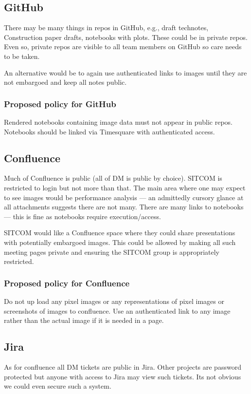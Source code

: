 \subsection{GitHub}
There may be many things in repos in GitHub, e.g., draft technotes, Construction paper drafts, notebooks with plots.
These could be in private repos.
Even so, private repos are visible to all team members on GitHub so care needs to be taken.

An alternative would be to again use authenticated links to images until they are not embargoed and keep all notes public.

\subsubsection{Proposed policy for GitHub}
Rendered notebooks containing image data must not appear in public repos.
Notebooks should be linked via Timesquare with authenticated access.

\subsection{Confluence}
Much of Confluence is public (all of DM is public by choice).
SITCOM is restricted to login but not more than that.
The main area where one may expect to see images would be performance analysis --- an admittedly cursory glance at all attachments suggests there are not many.
There are many links to notebooks --- this is fine as notebooks require execution/access.

SITCOM would like a Confluence space where they could share presentations with potentially embargoed images.
This could be allowed by making all such meeting pages private and ensuring the SITCOM group is appropriately restricted.

\subsubsection{Proposed policy for Confluence}
Do not up load any pixel images or any representations of pixel images or screenshots of images to confluence.
Use an authenticated link to any image rather than the actual image if it is needed in a page.

\subsection{Jira}
As for confluence all DM tickets are public in Jira.
Other projects are password protected but anyone with access to Jira may view such tickets.
Its not obvious we could even secure such a system.


